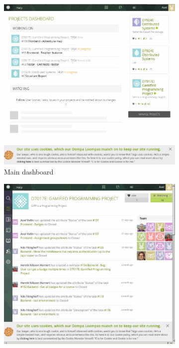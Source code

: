 \begin{figure}[hb]
    \begin{subfigure}{.3\textwidth}
        \includegraphics[width=\textwidth]{img/taiga_dash.jpg}
        \caption{Main dashboard}
    \end{subfigure}
    \hfill
    \begin{subfigure}{.3\textwidth}
        \includegraphics[width=\textwidth]{img/taiga_overview.jpg}

\end{subfigure}
\end{figure}
